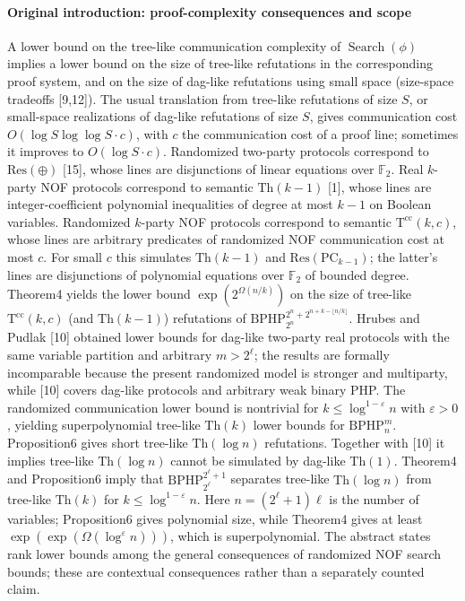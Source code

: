 \paragraph{Original introduction: proof-complexity consequences and scope}
A lower bound on the tree-like communication complexity of $\operatorname{Search}(\phi)$ implies a lower bound on the size of tree-like refutations in the corresponding proof system, and on the size of dag-like refutations using small space (size-space tradeoffs [9,12]). The usual translation from tree-like refutations of size $S$, or small-space realizations of dag-like refutations of size $S$, gives communication cost $O(\log S\log\log S\cdot c)$, with $c$ the communication cost of a proof line; sometimes it improves to $O(\log S\cdot c)$.
Randomized two-party protocols correspond to $\mathrm{Res}(\oplus)$ [15], whose lines are disjunctions of linear equations over $\mathbb F_2$. Real $k$-party NOF protocols correspond to semantic $\mathrm{Th}(k-1)$ [1], whose lines are integer-coefficient polynomial inequalities of degree at most $k-1$ on Boolean variables. Randomized $k$-party NOF protocols correspond to semantic $\mathrm T^{\mathrm{cc}}(k,c)$, whose lines are arbitrary predicates of randomized NOF communication cost at most $c$. For small $c$ this simulates $\mathrm{Th}(k-1)$ and $\mathrm{Res}(\mathrm{PC}_{k-1})$; the latter's lines are disjunctions of polynomial equations over $\mathbb F_2$ of bounded degree.
Theorem4 yields the lower bound $\exp(2^{\Omega(n/k)})$ on the size of tree-like $\mathrm T^{\mathrm{cc}}(k,c)$ (and $\mathrm{Th}(k-1)$) refutations of $\mathrm{BPHP}_{2^n}^{2^n+2^{n+k-\lfloor n/k\rfloor}}$.
Hrubes and Pudlak [10] obtained lower bounds for dag-like two-party real protocols with the same variable partition and arbitrary $m>2^\ell$; the results are formally incomparable because the present randomized model is stronger and multiparty, while [10] covers dag-like protocols and arbitrary weak binary PHP.
The randomized communication lower bound is nontrivial for $k\le\log^{1-\varepsilon}n$ with $\varepsilon>0$, yielding superpolynomial tree-like $\mathrm{Th}(k)$ lower bounds for $\mathrm{BPHP}_n^m$. Proposition6 gives short tree-like $\mathrm{Th}(\log n)$ refutations. Together with [10] it implies tree-like $\mathrm{Th}(\log n)$ cannot be simulated by dag-like $\mathrm{Th}(1)$.
Theorem4 and Proposition6 imply that $\mathrm{BPHP}_{2^\ell}^{2^\ell+1}$ separates tree-like $\mathrm{Th}(\log n)$ from tree-like $\mathrm{Th}(k)$ for $k\le\log^{1-\varepsilon}n$. Here $n=(2^\ell+1)\ell$ is the number of variables; Proposition6 gives polynomial size, while Theorem4 gives at least $\exp(\exp(\Omega(\log^\varepsilon n)))$, which is superpolynomial.
The abstract states rank lower bounds among the general consequences of randomized NOF search bounds; these are contextual consequences rather than a separately counted claim.
